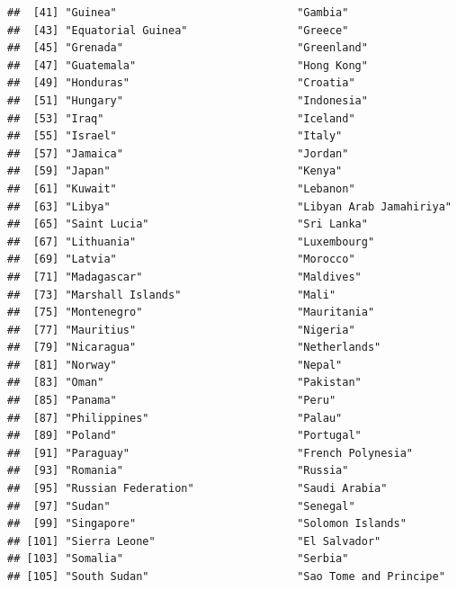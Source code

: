 \documentclass[]{article}
\begin{document}
\begin{verbatim}
##  [41] "Guinea"                            "Gambia"                           
##  [43] "Equatorial Guinea"                 "Greece"                           
##  [45] "Grenada"                           "Greenland"                        
##  [47] "Guatemala"                         "Hong Kong"                        
##  [49] "Honduras"                          "Croatia"                          
##  [51] "Hungary"                           "Indonesia"                        
##  [53] "Iraq"                              "Iceland"                          
##  [55] "Israel"                            "Italy"                            
##  [57] "Jamaica"                           "Jordan"                           
##  [59] "Japan"                             "Kenya"                            
##  [61] "Kuwait"                            "Lebanon"                          
##  [63] "Libya"                             "Libyan Arab Jamahiriya"           
##  [65] "Saint Lucia"                       "Sri Lanka"                        
##  [67] "Lithuania"                         "Luxembourg"                       
##  [69] "Latvia"                            "Morocco"                          
##  [71] "Madagascar"                        "Maldives"                         
##  [73] "Marshall Islands"                  "Mali"                             
##  [75] "Montenegro"                        "Mauritania"                       
##  [77] "Mauritius"                         "Nigeria"                          
##  [79] "Nicaragua"                         "Netherlands"                      
##  [81] "Norway"                            "Nepal"                            
##  [83] "Oman"                              "Pakistan"                         
##  [85] "Panama"                            "Peru"                             
##  [87] "Philippines"                       "Palau"                            
##  [89] "Poland"                            "Portugal"                         
##  [91] "Paraguay"                          "French Polynesia"                 
##  [93] "Romania"                           "Russia"                           
##  [95] "Russian Federation"                "Saudi Arabia"                     
##  [97] "Sudan"                             "Senegal"                          
##  [99] "Singapore"                         "Solomon Islands"                  
## [101] "Sierra Leone"                      "El Salvador"                      
## [103] "Somalia"                           "Serbia"                           
## [105] "South Sudan"                       "Sao Tome and Principe"            

\end{verbatim}
\end{document}
